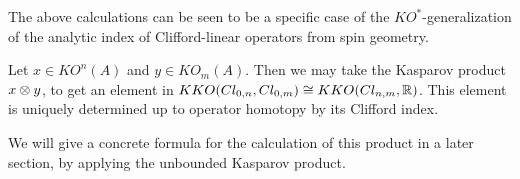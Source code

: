 The above calculations can be seen to be a specific case of the $KO^{*}$-generalization of the analytic index of Clifford-linear operators from spin geometry. 
\begin{remark}
	Let $x\in KO^n(A)$ and $y\in KO_m(A)$. Then we may take the Kasparov product $x\otimes y$, to get an element in $KKO(Cl_{0,n},Cl_{0,m})\cong KKO(Cl_{n,m},\mathbb{R})$. This element is uniquely determined up to operator homotopy by its Clifford index.
\end{remark}
We will give a concrete formula for the calculation of this product in a later section, by applying the unbounded Kasparov product. 